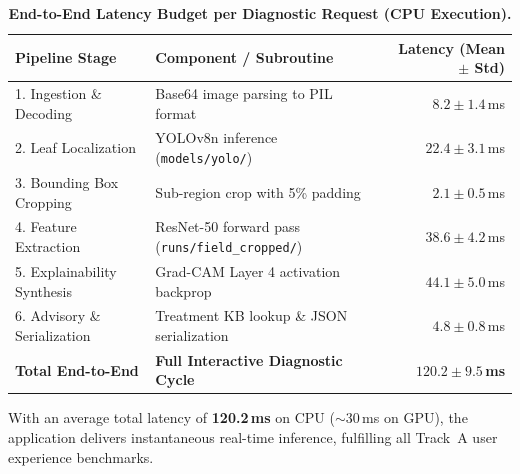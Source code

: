 \begin{table}[!ht]
\centering
\caption{\textbf{End-to-End Latency Budget per Diagnostic Request (CPU Execution).}}
\label{tab:latency_budget}
\small
\renewcommand{\arraystretch}{1.15}
\begin{tabular}{@{}p{3.8cm}p{7.0cm}r@{}}
\toprule
\textbf{Pipeline Stage} & \textbf{Component / Subroutine} & \textbf{Latency (Mean $\pm$ Std)} \\
\midrule
1. Ingestion \& Decoding & Base64 image parsing to PIL format & $8.2 \pm 1.4$\,ms \\
2. Leaf Localization & YOLOv8n inference (\texttt{models/yolo/}) & $22.4 \pm 3.1$\,ms \\
3. Bounding Box Cropping & Sub-region crop with 5\% padding & $2.1 \pm 0.5$\,ms \\
4. Feature Extraction & ResNet-50 forward pass (\texttt{runs/field\_cropped/}) & $38.6 \pm 4.2$\,ms \\
5. Explainability Synthesis & Grad-CAM Layer 4 activation backprop & $44.1 \pm 5.0$\,ms \\
6. Advisory \& Serialization & Treatment KB lookup \& JSON serialization & $4.8 \pm 0.8$\,ms \\
\midrule
\textbf{Total End-to-End} & \textbf{Full Interactive Diagnostic Cycle} & $\mathbf{120.2 \pm 9.5}$\,\textbf{ms} \\
\bottomrule
\end{tabular}
\end{table}

With an average total latency of \textbf{120.2\,ms} on CPU ($\sim$30\,ms on GPU), the application delivers instantaneous real-time inference, fulfilling all Track~A user experience benchmarks.
